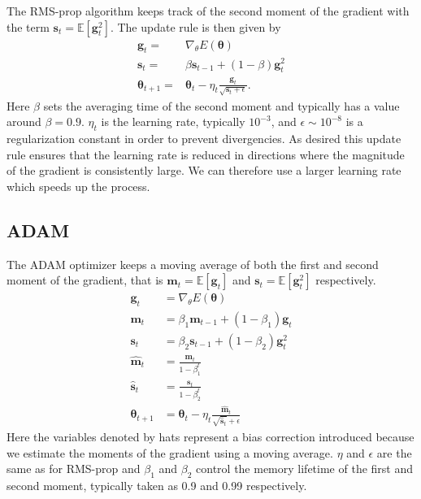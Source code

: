 \documentclass[twoside,english]{uiofysmaster}
\begin{document}
The RMS-prop algorithm keeps track of the second moment of the gradient with the term $\mathbf{s}_t = \mathbb{E}[\mathbf{g}_t^2]$. The update rule is then given by
\begin{align}
	\mathbf{g}_t =& \nabla_\theta E(\bm{\theta}) \\
	\mathbf{s}_t =& \beta \mathbf{s}_{t-1} + (1-\beta)\mathbf{g}_t^2 \\
	\bm{\theta}_{t+1} =& \bm{\theta}_t - \eta_t \frac{\mathbf{g}_t}{\sqrt{\mathbf{s}_t + \epsilon}}.
\end{align}
Here $\beta$ sets the averaging time of the second moment and typically has a value around $\beta=0.9$. $\eta_t$ is the learning rate, typically $10^{-3}$, and $\epsilon \sim 10^{-8}$ is a regularization constant in order to prevent divergencies. As desired this update rule ensures that the learning rate is reduced in directions where the magnitude of the gradient is consistently large. We can therefore use a larger learning rate which speeds up the process.

\subsection{ADAM}
\label{sec:adam}
The ADAM optimizer keeps a moving average of both the first and second moment of the gradient, that is $\mathbf{m}_t = \mathbb{E}[\mathbf{g}_t]$ and $\mathbf{s}_t = \mathbb{E}[\mathbf{g}_t^2]$ respectively.
\begin{align}
	\mathbf{g}_t &= \nabla_\theta E(\bm{\theta}) \\
	\mathbf{m}_t &= \beta_1 \mathbf{m}_{t-1} + (1-\beta_1) \mathbf{g}_t \\
	\mathbf{s}_t &= \beta_2 \mathbf{s}_{t-1} + (1-\beta_2) \mathbf{g}_t^2 \\
	\hat{\mathbf{m}}_t &= \frac{\mathbf{m}_t}{1-\beta_1^t} \\
	\hat{\mathbf{s}}_t &= \frac{\mathbf{s}_t}{1-\beta_2^t} \\
	\bm{\theta}_{t+1} &= \bm{\theta}_t - \eta_t \frac{\hat{\mathbf{m}}_t}{\sqrt{\hat{\mathbf{s}}_t} + \epsilon}
\end{align}
Here the variables denoted by hats represent a bias correction introduced because we estimate the moments of the gradient using a moving average. $\eta$ and $\epsilon$ are the same as for RMS-prop and $\beta_1$ and $\beta_2$ control the memory lifetime of the first and second moment, typically taken as 0.9 and 0.99 respectively.
\end{document}
